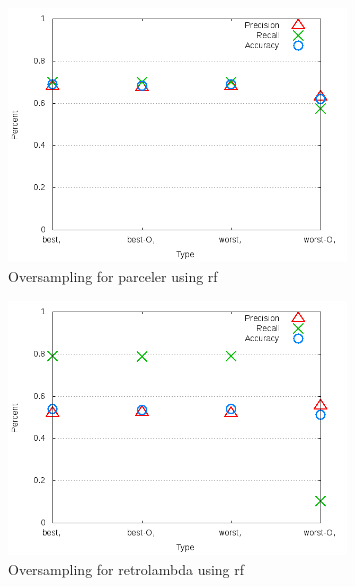 \begin{figure}[!t]
\centering
\includegraphics[width=0.8\textwidth]{images/rf/test_4/parceler_sample_range.png}
\caption{Oversampling for parceler using \gls{rf}}
\label{fig:test_4_parceler_rf}
\end{figure}

\begin{figure}[!t]
\centering
\includegraphics[width=0.8\textwidth]{images/rf/test_4/retrolambda_sample_range.png}
\caption{Oversampling for retrolambda using \gls{rf}}
\label{fig:test_4_retrolambda_rf}
\end{figure}


